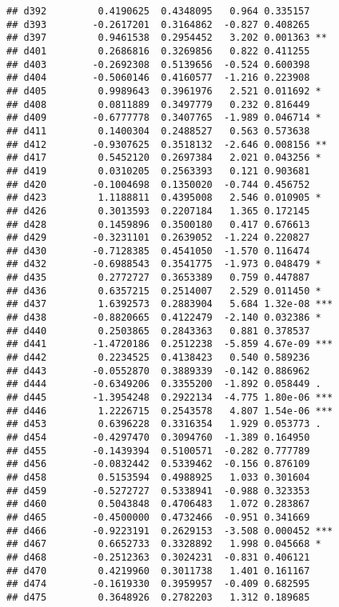 \documentclass[
]{article}
\begin{document}
\begin{verbatim}
## d392         0.4190625  0.4348095   0.964 0.335157    
## d393        -0.2617201  0.3164862  -0.827 0.408265    
## d397         0.9461538  0.2954452   3.202 0.001363 ** 
## d401         0.2686816  0.3269856   0.822 0.411255    
## d403        -0.2692308  0.5139656  -0.524 0.600398    
## d404        -0.5060146  0.4160577  -1.216 0.223908    
## d405         0.9989643  0.3961976   2.521 0.011692 *  
## d408         0.0811889  0.3497779   0.232 0.816449    
## d409        -0.6777778  0.3407765  -1.989 0.046714 *  
## d411         0.1400304  0.2488527   0.563 0.573638    
## d412        -0.9307625  0.3518132  -2.646 0.008156 ** 
## d417         0.5452120  0.2697384   2.021 0.043256 *  
## d419         0.0310205  0.2563393   0.121 0.903681    
## d420        -0.1004698  0.1350020  -0.744 0.456752    
## d423         1.1188811  0.4395008   2.546 0.010905 *  
## d426         0.3013593  0.2207184   1.365 0.172145    
## d428         0.1459896  0.3500180   0.417 0.676613    
## d429        -0.3231101  0.2639052  -1.224 0.220827    
## d430        -0.7128385  0.4541050  -1.570 0.116474    
## d432        -0.6988543  0.3541775  -1.973 0.048479 *  
## d435         0.2772727  0.3653389   0.759 0.447887    
## d436         0.6357215  0.2514007   2.529 0.011450 *  
## d437         1.6392573  0.2883904   5.684 1.32e-08 ***
## d438        -0.8820665  0.4122479  -2.140 0.032386 *  
## d440         0.2503865  0.2843363   0.881 0.378537    
## d441        -1.4720186  0.2512238  -5.859 4.67e-09 ***
## d442         0.2234525  0.4138423   0.540 0.589236    
## d443        -0.0552870  0.3889339  -0.142 0.886962    
## d444        -0.6349206  0.3355200  -1.892 0.058449 .  
## d445        -1.3954248  0.2922134  -4.775 1.80e-06 ***
## d446         1.2226715  0.2543578   4.807 1.54e-06 ***
## d453         0.6396228  0.3316354   1.929 0.053773 .  
## d454        -0.4297470  0.3094760  -1.389 0.164950    
## d455        -0.1439394  0.5100571  -0.282 0.777789    
## d456        -0.0832442  0.5339462  -0.156 0.876109    
## d458         0.5153594  0.4988925   1.033 0.301604    
## d459        -0.5272727  0.5338941  -0.988 0.323353    
## d460         0.5043848  0.4706483   1.072 0.283867    
## d465        -0.4500000  0.4732466  -0.951 0.341669    
## d466        -0.9223191  0.2629153  -3.508 0.000452 ***
## d467         0.6652733  0.3328892   1.998 0.045668 *  
## d468        -0.2512363  0.3024231  -0.831 0.406121    
## d470         0.4219960  0.3011738   1.401 0.161167    
## d474        -0.1619330  0.3959957  -0.409 0.682595    
## d475         0.3648926  0.2782203   1.312 0.189685    

\end{verbatim}
\end{document}
